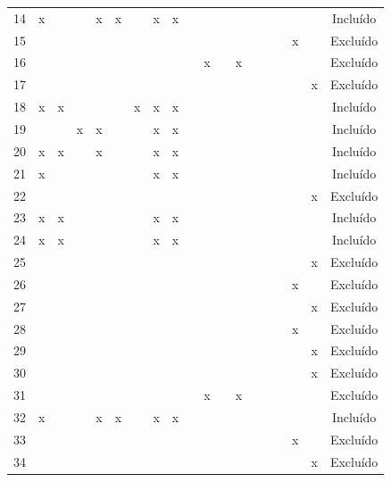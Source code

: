 \documentclass[
	12pt,				%
	oneside,			%
	a4paper,			%
	english,			%
	brazil				%
	]{abntex2ppgsi}
\begin{document}
\begin{apendicesenv}
\begin{table}[H]
\begin{tabular}{c | c c c c c c c c | c c c c c c c c c | c}
14 & x &   &   & x & x &   & x & x &   &   &   &   &   &   &   &   &   & Incluído \\
15 &   &   &   &   &   &   &   &   &   &   &   &   &   &   &   & x &   & Excluído \\
16 &   &   &   &   &   &   &   &   &   & x &   & x &   &   &   &   &   & Excluído \\
17 &   &   &   &   &   &   &   &   &   &   &   &   &   &   &   &   & x & Excluído \\
18 & x & x &   &   &   & x & x & x &   &   &   &   &   &   &   &   &   & Incluído \\
19 &   &   & x & x &   &   & x & x &   &   &   &   &   &   &   &   &   & Incluído \\
20 & x & x &   & x &   &   & x & x &   &   &   &   &   &   &   &   &   & Incluído \\
21 & x &   &   &   &   &   & x & x &   &   &   &   &   &   &   &   &   & Incluído \\
22 &   &   &   &   &   &   &   &   &   &   &   &   &   &   &   &   & x & Excluído \\
23 & x & x &   &   &   &   & x & x &   &   &   &   &   &   &   &   &   & Incluído \\
24 & x & x &   &   &   &   & x & x &   &   &   &   &   &   &   &   &   & Incluído \\
25 &   &   &   &   &   &   &   &   &   &   &   &   &   &   &   &   & x & Excluído \\
26 &   &   &   &   &   &   &   &   &   &   &   &   &   &   &   & x &   & Excluído \\
27 &   &   &   &   &   &   &   &   &   &   &   &   &   &   &   &   & x & Excluído \\
28 &   &   &   &   &   &   &   &   &   &   &   &   &   &   &   & x &   & Excluído \\
29 &   &   &   &   &   &   &   &   &   &   &   &   &   &   &   &   & x & Excluído \\
30 &   &   &   &   &   &   &   &   &   &   &   &   &   &   &   &   & x & Excluído \\
31 &   &   &   &   &   &   &   &   &   & x &   & x &   &   &   &   &   & Excluído \\
32 & x &   &   & x & x &   & x & x &   &   &   &   &   &   &   &   &   & Incluído \\
33 &   &   &   &   &   &   &   &   &   &   &   &   &   &   &   & x &   & Excluído \\
34 &   &   &   &   &   &   &   &   &   &   &   &   &   &   &   &   & x & Excluído \\

\end{tabular}
\end{table}
\end{apendicesenv}
\end{document}
